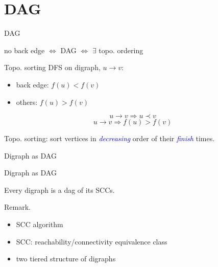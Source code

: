 \section{DAG}

\begin{frame}{DAG}
  \begin{center}
    no back edge $\iff$ DAG $\iff$ $\exists$ topo. ordering
  \end{center}

  \begin{block}{Topo. sorting}
    DFS on digraph, $u \to v$:
    \begin{itemize}
      \item back edge: $f(u) < f(v)$
      \item others: $f(u) > f(v)$
    \end{itemize}

    \[ u \to v \Rightarrow u \prec v \] 
    \[ u \to v \Rightarrow f(u) > f(v) \]

    \begin{center}
      Topo. sorting: sort vertices in \textcolor{blue}{\emph{decreasing}} order of their \textcolor{blue}{\emph{finish}} times.
    \end{center}
  \end{block}
\end{frame}
\begin{frame}{Digraph as DAG}
  \begin{exampleblock}{Digraph as DAG }
    \begin{theorem}
      Every digraph is a dag of its SCCs.
    \end{theorem}
  \end{exampleblock}

  \begin{alertblock}{Remark.}
    \begin{itemize}
      \item SCC algorithm
      \item SCC: reachability/connectivity equivalence class
      \item two tiered structure of digraphs
    \end{itemize}
  \end{alertblock}
\end{frame}
